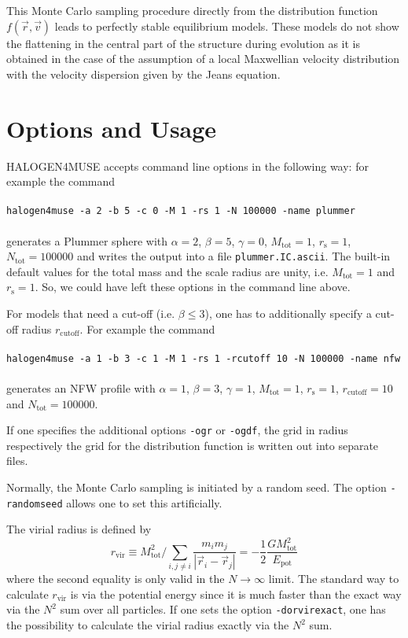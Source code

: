 \documentclass[a4paper,10pt]{article}
\newcommand{\rvir}{r_{\mathrm{vir}}}
\newcommand{\rs}{r_{\mathrm{s}}}
\newcommand{\rcut}{r_{\mathrm{cutoff}}}
\newcommand{\Mtot}{M_{\mathrm{tot}}}
\newcommand{\Ntot}{N_{\mathrm{tot}}}
\begin{document}
This Monte Carlo sampling procedure directly from the distribution function $f(\vec{r},\vec{v})$ leads to perfectly stable equilibrium models. These models do not show the flattening in the central part of the structure during evolution as it is obtained in the case of the assumption of a local Maxwellian velocity distribution with the velocity dispersion given by the Jeans equation.

\section{Options and Usage}

HALOGEN4MUSE accepts command line options in the following way: for example the command \\ 
\\
\texttt{halogen4muse -a 2 -b 5 -c 0 -M 1 -rs 1 -N 100000 -name plummer} \\ 
\\
generates a Plummer sphere with $\alpha = 2$, $\beta = 5$, $\gamma = 0$, $\Mtot = 1$, $\rs = 1$, $\Ntot = 100000$ and writes the output into a file \texttt{plummer.IC.ascii}. The built-in default values for the total mass and the scale radius are unity, i.e. $\Mtot = 1$ and $\rs = 1$. So, we could have left these options in the command line above.

For models that need a cut-off (i.e. $\beta \leq 3$), one has to additionally specify a cut-off radius $\rcut$. For example the command \\
\\
\texttt{halogen4muse -a 1 -b 3 -c 1 -M 1 -rs 1 -rcutoff 10 -N 100000 -name nfw}\\ 
\\
generates an NFW profile with $\alpha = 1$, $\beta = 3$, $\gamma = 1$, $\Mtot = 1$, $\rs = 1$, $\rcut = 10$ and $\Ntot = 100000$.

If one specifies the additional options \texttt{-ogr} or \texttt{-ogdf}, the grid in radius respectively the grid for the distribution function is written out into separate files.

Normally, the Monte Carlo sampling is initiated by a random seed. The option \texttt{-randomseed} allows one to set this artificially.

The virial radius is defined by
\begin{equation}
\rvir \equiv {\Mtot^2}/{\sum_{i, j \neq i} \frac{m_i m_j}{|\vec{r}_i - \vec{r}_j|}} = - \frac{1}{2} \frac{G \Mtot^2}{E_{\mathrm{pot}}}
\end{equation}
where the second equality is only valid in the $N \rightarrow \infty$ limit. The standard way to calculate $\rvir$ is via the potential energy since it is much faster than the exact way via the $N^2$ sum over all particles. If one sets the option \texttt{-dorvirexact}, one has the possibility to calculate the virial radius exactly via the $N^2$ sum.
\end{document}
